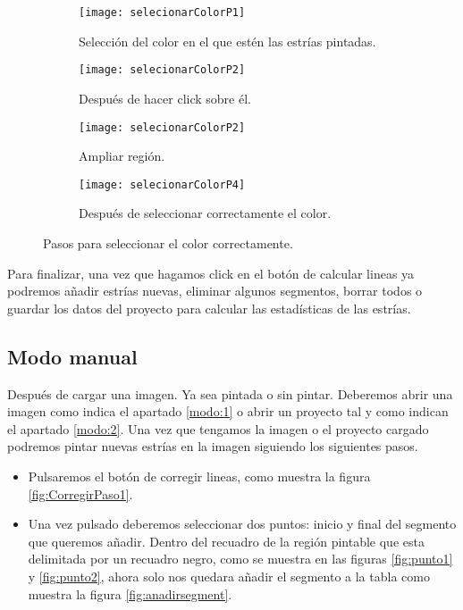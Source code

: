 \begin{figure}
	\begin{subfigure}[c]{.5\linewidth}
	\centering\large \texttt{[image: selecionarColorP1]}
	\caption{Selección del color en el que estén las estrías pintadas.}\label{fig:selecionarColorP1}
	\end{subfigure}%
	\begin{subfigure}[c]{.5\linewidth}
	\centering\large \texttt{[image: selecionarColorP2]}
	\caption{Después de hacer click sobre él.}
	\label{fig:selecionarColorP2}
	\end{subfigure}%
	
	\begin{subfigure}[c]{.5\linewidth}
	\centering\large \texttt{[image: selecionarColorP2]}
	\caption{Ampliar región.}
	\label{fig:selecionarColorP3}
	\end{subfigure}%
	\begin{subfigure}[c]{.5\linewidth}
	\centering\large \texttt{[image: selecionarColorP4]}
	\caption{Después de seleccionar correctamente el color.}
	\label{fig:selecionarColorP4}
	\end{subfigure}%
	\label{fig:pasosColor}
	\caption{Pasos para seleccionar el color correctamente.}
\end{figure}

Para finalizar, una vez que hagamos click en el botón de calcular lineas ya podremos añadir estrías nuevas, eliminar algunos segmentos, borrar todos o guardar los datos del proyecto para calcular las estadísticas de las estrías.


\subsection{Modo manual}
Después de cargar una imagen. Ya sea pintada o sin pintar. Deberemos abrir una imagen como indica el apartado \ref{modo:1} o abrir un proyecto tal y como indican el apartado \ref{modo:2}.
Una vez que tengamos la imagen o el proyecto cargado podremos pintar nuevas estrías en la imagen siguiendo los siguientes pasos.

\begin{itemize}
\item Pulsaremos el botón de corregir lineas, como muestra la figura \ref{fig:CorregirPaso1}.

\item Una vez pulsado deberemos seleccionar dos puntos: inicio y final del segmento que queremos añadir. 
Dentro del recuadro de la región pintable que esta delimitada por un recuadro negro, como se muestra en las figuras \ref{fig:punto1} y \ref{fig:punto2}, ahora solo nos quedara añadir el segmento a la tabla como muestra la figura \ref{fig:anadirsegment}.
\end{itemize}


